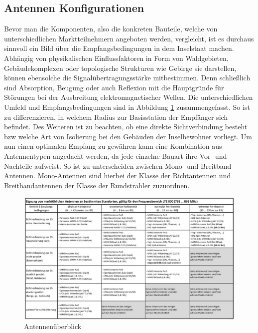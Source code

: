 	\subsection{Antennen Konfigurationen}
	\label{subsec:Antennen Konfigurationen}
Bevor man die Komponenten, also die konkreten Bauteile, welche von unterschiedlichen Marktteilnehmern angeboten werden, vergleicht, ist es durchaus sinnvoll ein Bild über die Empfangsbedingungen in dem Inselstaat machen. Abhängig von physikalischen Einflussfaktoren in Form von Waldgebieten, Gebäudekomplexen oder topologische Strukturen wie Gebirge sie darstellen, können ebensolche die Signalübertragungsstärke mitbestimmen. Denn schließlich sind Absorption, Beugung oder auch Reflexion mit die Hauptgründe für Störungen bei der Ausbreitung elektromagnetischer Wellen. Die unterschiedlichen Umfeld und Empfangsbedingungen sind in Abbildung \ref{fig:tabellemcnantennen} zusammengefasst. So ist zu differenzieren, in welchem Radius zur Basisstation der Empfänger sich befindet. Des Weiteren ist zu beachten, ob eine direkte Sichtverbindung besteht bzw welche Art von Isolierung bei den Gebäuden der Inselbewohner vorliegt. Um nun einen optimalen Empfang zu gewähren kann eine Kombination aus Antennentypen angedacht werden, da jede einzelne Bauart ihre Vor- und Nachteile aufweist. So ist zu unterscheiden zwischen Mono- und Breitband Antennen. Mono-Antennen sind hierbei der Klasse der Richtantennen und Breitbandantennen der Klasse der Rundstrahler zuzuordnen. \cite{Sch19}
\begin{figure}[ht]
	\centering
	\includegraphics[width=1\linewidth]{images/tabellemcnantennen}
	\caption{Antennenüberblick  \protect\cite{Sch19}}
	\label{fig:tabellemcnantennen}
\end{figure}


\raggedbottom 
